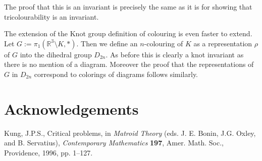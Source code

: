 \documentclass[12pt]{amsart}
\theoremstyle{definition}
\theoremstyle{remark}
\numberwithin{equation}{section}
\newcommand{\bb}[1]{\mathbb{#1}}
\begin{document}
The proof that this is an invariant is precisely the same
as it is for showing that tricolourability is an invariant.

The extension of the Knot group definition of colouring is
even faster to extend. Let $G:=\pi_1(\bb{R}^3\setminus K,*)$. Then we
define an $n$-colouring of $K$ as a representation
$\rho$ of $G$ into the dihedral group $D_{2n}$. As before this
is clearly a knot invariant as there is no mention of a diagram.
Moreover the proof that the representations of $G$ in $D_{2n}$
correspond to colorings of diagrams follows similarly.

\section*{Acknowledgements}
\begin{thebibliography}{99}

 Kung, J.P.S., Critical problems, in {\em Matroid  
Theory} (eds. J. E. Bonin, J.G. Oxley, and B. Servatius), {\em  
Contemporary Mathematics} {\bf 197}, Amer. Math. Soc., Providence,  
1996, pp. 1--127.

\end{thebibliography}
\end{document}

